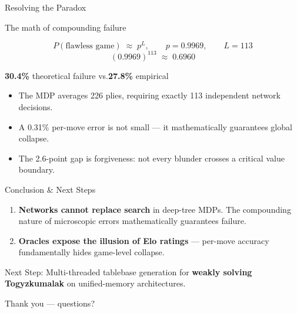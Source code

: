 \documentclass[aspectratio=169]{beamer}
\renewcommand{\framesubtitle}[1]{%
  {\usebeamerfont{framesubtitle}\color{cMuted}\small #1\par\vspace{3pt}}}
\begin{document}
\begin{frame}{Resolving the Paradox}
  \framesubtitle{The math of compounding failure}
  \begin{equation*}
    P(\text{flawless game}) \;\approx\; p^{L},
    \qquad p = 0.9969, \qquad L = 113
  \end{equation*}
  \begin{equation*}
    (0.9969)^{113} \;\approx\; 0.6960
  \end{equation*}
  \vspace{-0.2cm}
  \begin{center}
    {\color{cOrange}\large \textbf{30.4\%} theoretical failure \quad vs.\quad \textbf{27.8\%} empirical}
  \end{center}
  \vspace{0.1cm}
  \begin{itemize}
    \item The MDP averages 226 plies, requiring exactly 113 independent network decisions.
    \item A 0.31\% per-move error is not small --- it mathematically guarantees global collapse.
    \item The 2.6-point gap is forgiveness: not every blunder crosses a critical value boundary.
  \end{itemize}
\end{frame}

\begin{frame}{Conclusion \& Next Steps}
  \vspace{0.4cm}
  \begin{enumerate}
    \setlength{\itemsep}{1.2em}
    \item \textbf{Networks cannot replace search} in deep-tree MDPs. The compounding nature of microscopic errors mathematically guarantees failure.
    \item \textbf{Oracles expose the illusion of Elo ratings} --- per-move accuracy fundamentally hides game-level collapse.
  \end{enumerate}
  \vspace{0.6cm}
  \begin{center}
    {\large Next Step: Multi-threaded tablebase generation for \textbf{weakly solving Togyzkumalak} on unified-memory architectures.}
  \end{center}
  \vspace{0.4cm}
  \begin{center}
    {\color{cOrange}\large Thank you --- questions?}
  \end{center}
\end{frame}
\end{document}
